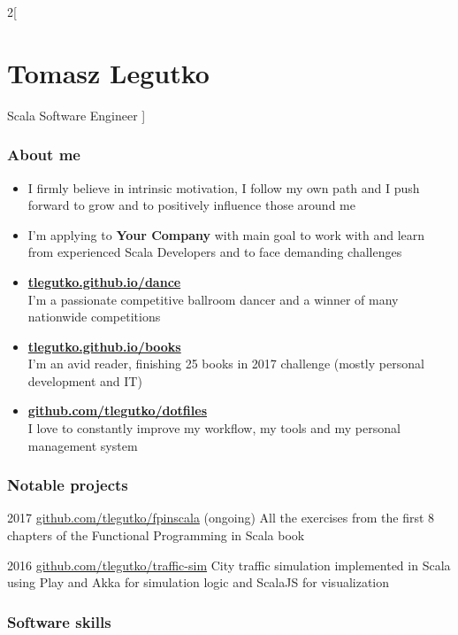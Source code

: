 \documentclass{tccv}
\begin{document}
\begin{multicols}{2}[
\part{Tomasz Legutko}{Scala Software Engineer}
]
\section{About me}
\begin{itemize}[noitemsep,topsep=0pt]
\item I firmly believe in intrinsic motivation, I follow my own path and I push forward to grow and to positively influence those around me
\item I'm applying to {\bfseries Your Company} with main goal to work with and learn from experienced Scala Developers and to face demanding challenges
\item {\bfseries\href{https://tlegutko.github.io/dance}{tlegutko.github.io/dance}}\\
  I'm a passionate competitive ballroom dancer and a winner of many nationwide competitions
\item {\bfseries\href{https://tlegutko.github.io/books}{tlegutko.github.io/books}}\\
  I'm an avid reader, finishing 25 books in 2017 challenge (mostly personal development and IT)
\item {\bfseries\href{https://github.com/tlegutko/dotfiles}{github.com/tlegutko/dotfiles}}\\
  I love to constantly improve my workflow, my tools and my personal management system

\end{itemize}

\section{Notable projects}
\begin{yearlist}

\item{2017}
     {\href{https://github.com/tlegutko/fpinscala}{github.com/tlegutko/fpinscala} (ongoing)}
     {All the exercises from the first 8 chapters of the Functional Programming in Scala book}

\item{2016}
     {\href{https://github.com/tlegutko/traffic-sim}{github.com/tlegutko/traffic-sim}}
     {City traffic simulation implemented in Scala using Play and Akka for simulation logic and ScalaJS for visualization}

\end{yearlist}

\section{Software skills}


\end{multicols}
\end{document}
